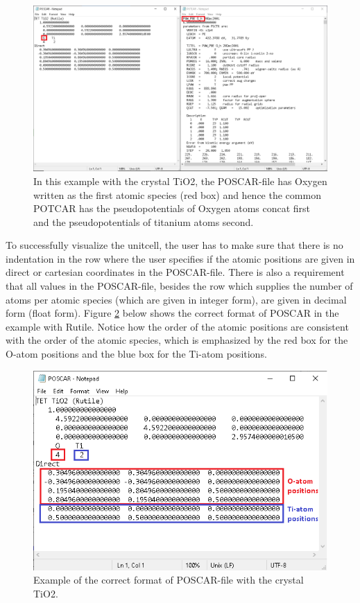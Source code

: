\begin{figure}[H]
    \centering
    \includegraphics[scale = 0.48]{Images/usermanual_unit_TET.png}
    \caption{In this example with the crystal TiO2, the POSCAR-file has Oxygen written as the first atomic species (red box) and hence the common POTCAR has the pseudopotentials of Oxygen atoms concat first and the pseudopotentials of titanium atoms second.}
    \label{fig:VASP_unit}
\end{figure}

To successfully visualize the unitcell, the user has to make sure that there is no indentation in the row where the user specifies if the atomic positions are given in direct or cartesian coordinates in the POSCAR-file. There is also a requirement that all values in the POSCAR-file, besides the row which supplies the number of atoms per atomic species (which are given in integer form), are given in decimal form (float form). Figure \ref{fig:VASP_unit_1} below shows the correct format of POSCAR in the example with Rutile. Notice how the order of the atomic positions are consistent with the order of the atomic species, which is emphasized by the red box for the O-atom positions and the blue box for the Ti-atom positions.

\begin{figure}[H]
    \centering
    \includegraphics[scale = 0.50]{Images/usermanual_unit_TET_2.png}
    \caption{Example of the correct format of POSCAR-file with the crystal TiO2.}
    \label{fig:VASP_unit_1}
\end{figure}

